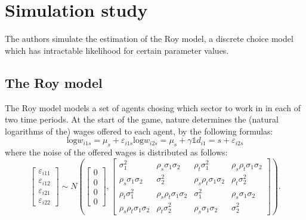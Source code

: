 \section{Simulation study}
\label{sec:simulation}

The authors simulate the estimation of the Roy model, a discrete choice model which has intractable likelihood for certain parameter values.

\subsection{The Roy model}
\label{sec:roy}

The Roy model models a set of agents chosing which sector to work in in each of two time periods.
At the start of the game, nature determines the (natural logarithms of the) wages offered to each agent, by the following formulas:
\begin{equation} %
    \text{log} w_{i1s} = \mu_s + \varepsilon_{i1s}
    \text{log} w_{i2s} = \mu_s + \gamma \mathbb{1} {d_{i1} = s} + \varepsilon_{i2s} %
\end{equation}
where the noise of the offered wages is distributed as follows:
\begin{equation}
    \left[\begin{array}{l}\varepsilon_{i 11} \\ \varepsilon_{i 12} \\ \varepsilon_{i 21} \\ \varepsilon_{i 22}\end{array}\right] \sim N\left(\left[\begin{array}{l}0 \\ 0 \\ 0 \\ 0\end{array}\right],\left[\begin{array}{cccc}\sigma_1^2 & \rho_s \sigma_1 \sigma_2 & \rho_t \sigma_1^2 & \rho_s \rho_t \sigma_1 \sigma_2 \\ \rho_s \sigma_1 \sigma_2 & \sigma_2^2 & \rho_s \rho_t \sigma_1 \sigma_2 & \rho_t \sigma_2^2 \\ \rho_t \sigma_1^2 & \rho_s \rho_t \sigma_1 \sigma_2 & \sigma_1^2 & \rho_s \sigma_1 \sigma_2 \\ \rho_s \rho_t \sigma_1 \sigma_2 & \rho_t \sigma_2^2 & \rho_s \sigma_1 \sigma_2 & \sigma_2^2\end{array}\right]\right).
\end{equation}

